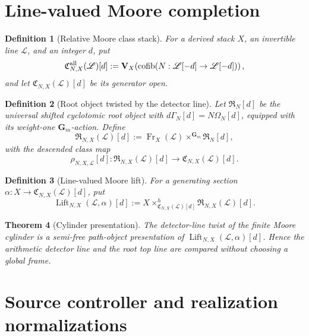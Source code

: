 \documentclass[11pt]{article}
\newtheorem{theorem}{Theorem}[section]
\newtheorem{definition}[theorem]{Definition}
\theoremstyle{remark}
\begin{document}
\section{Line-valued Moore completion}

\begin{definition}[Relative Moore class stack]
\label{P2R-def:v91-relative-moore-line}
For a derived stack \(X\), an invertible line \(\mathscr L\), and an integer
\(d\), put
\[
 \mathfrak C^{\rm all}_{N,X}(\mathscr L)[d]
 :=\mathbf V_X\!\left(
 \operatorname{cofib}(N:\mathscr L[-d]\to\mathscr L[-d])
 \right),
\]
and let \(\mathfrak C_{N,X}(\mathscr L)[d]\) be its generator open.
\end{definition}

\begin{definition}[Root object twisted by the detector line]
\label{P2R-def:v92-relative-root-object}
Let \(\mathfrak R_N[d]\) be the universal shifted cyclotomic root object with
\(d\Gamma_N[d]=N\Omega_N[d]\), equipped with its weight-one
\(\mathbf G_m\)-action.  Define
\[
 \mathfrak R_{N,X}(\mathscr L)[d]
 :=\operatorname{Fr}_X(\mathscr L)
   \times^{\mathbf G_m}\mathfrak R_N[d],
\]
with the descended class map
\[
 \rho_{N,X,\mathscr L}[d]:
 \mathfrak R_{N,X}(\mathscr L)[d]
 \longrightarrow\mathfrak C_{N,X}(\mathscr L)[d].
\]
\end{definition}

\begin{definition}[Line-valued Moore lift]
\label{P2R-def:v92-line-valued-lift}
For a generating section
\(\alpha:X\to\mathfrak C_{N,X}(\mathscr L)[d]\), put
\[
 \operatorname{Lift}_{N,X}(\mathscr L,\alpha)[d]
 :=X\times^h_{\mathfrak C_{N,X}(\mathscr L)[d]}
      \mathfrak R_{N,X}(\mathscr L)[d].
\]
\end{definition}

\begin{theorem}[Cylinder presentation]
\label{P2R-thm:v92-relative-cylinder-presents-lift}
The detector-line twist of the finite Moore cylinder is a semi-free
path-object presentation of
\(\operatorname{Lift}_{N,X}(\mathscr L,\alpha)[d]\).  Hence the arithmetic
detector line and the root top line are compared without choosing a global
frame.
\end{theorem}

\section{Source controller and realization normalizations}
\end{document}

